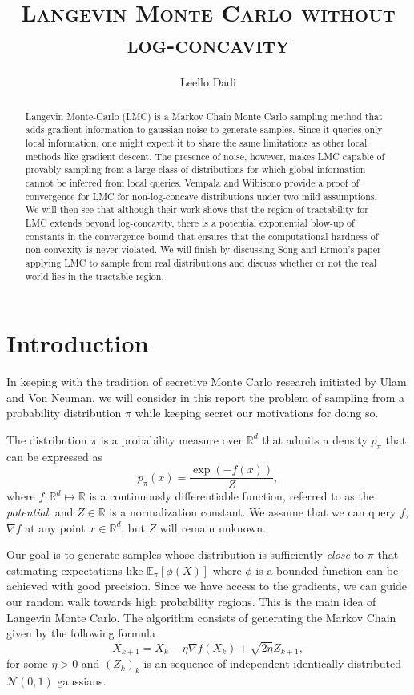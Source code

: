 \documentclass[11pt,twoside]{article}
\title{\textsc{Langevin Monte Carlo without log-concavity}}
\author{Leello Dadi}
\date{}
\newcommand{\E}{\mathbb{E}}
\newcommand{\R}{\mathbb{R}}
\begin{document}
\maketitle

\begin{abstract}
    Langevin Monte-Carlo (LMC) is a Markov Chain Monte Carlo sampling method that adds gradient information to gaussian noise to generate samples. Since it queries only local information, one might expect it to share the same limitations as other local methods like gradient descent. The presence of noise, however, makes LMC capable of provably sampling from a large class of distributions for which global information cannot be inferred from local queries. Vempala and Wibisono provide a proof \cite{vempala_rapid_2019} of convergence for LMC for non-log-concave distributions under two mild assumptions. We will then see that although their work shows that the region of tractability for LMC extends beyond log-concavity, there is a potential exponential blow-up of constants in the convergence bound that ensures that the computational hardness of non-convexity is never violated.  We will finish by discussing Song and Ermon's paper applying LMC to sample from real distributions and discuss whether or not the real world lies in the tractable region.
\end{abstract}

\section{Introduction}

In keeping with the tradition of secretive Monte Carlo research initiated by Ulam and Von Neuman, we will consider in this report the problem of sampling from a probability distribution $\pi$ while keeping secret our motivations for doing so. 

The distribution $\pi$ is a probability measure over $\R^d$ that admits a density $p_\pi$ that can be expressed as
\[
p_\pi(x) = \frac{\exp{\left(-f(x)\right)}}{Z},
\]
where $f: \R^d \mapsto \R$ is a continuously differentiable function, referred to as the \textit{potential}, and $Z \in \R$ is a normalization constant. We assume that we can query $f$, $\nabla f$ at any point $x \in \R^d$, but $Z$ will remain unknown.

Our goal is to generate samples whose distribution is sufficiently \textit{close} to $\pi$ that estimating expectations like $\E_\pi[\phi(X)]$ where $\phi$ is a bounded function can be achieved with good precision. 
Since we have access to the gradients, we can guide our random walk towards high probability regions. This is the main idea of Langevin Monte Carlo. The algorithm consists of generating the Markov Chain given by the following formula
\begin{equation}
X_{k+1} = X_k - \eta \nabla f(X_k) + \sqrt{2\eta}Z_{k+1},
\label{eq:LMC}
\tag{LMC}
\end{equation}
for some $\eta > 0$ and $(Z_k)_k$ is an sequence of independent identically distributed $\mathcal{N}(0, 1)$ gaussians.
\end{document}
